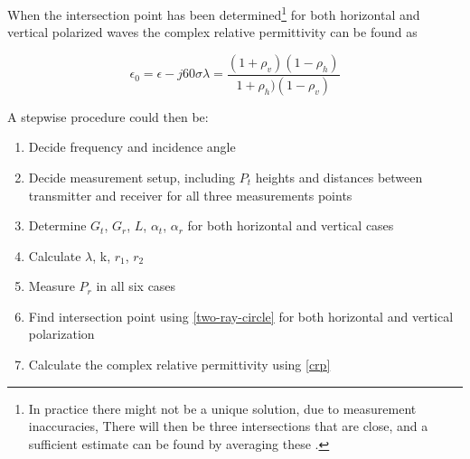 When the intersection point has been determined\footnote{In practice there might not be a unique solution, due to measurement inaccuracies, There will then be three intersections that are close, and a sufficient estimate can be found by averaging these \citep{Kim}.} for both horizontal and vertical polarized waves the complex relative permittivity can be found as\citep{Kim}

\begin{equation}\label{crp}
\epsilon_0=\epsilon-j60\sigma\lambda=\frac{(1+\rho_v)(1-\rho_h)}{1+\rho_h)(1-\rho_v)}
\end{equation}
\begin{where}
\end{where}

A stepwise procedure could then be:
\begin{enumerate}
	\item Decide frequency and incidence angle
	\item Decide measurement setup, including $P_t$ heights and distances between transmitter and receiver for all three measurements points
	\item Determine $G_t$, $G_r$, $L$, $\alpha_t$, $\alpha_r$ for both horizontal and vertical cases
	\item Calculate $\lambda$, k, $r_1$, $r_2$
	\item Measure $P_r$ in all six cases
	\item Find intersection point using \autoref{two-ray-circle} for both horizontal and vertical polarization
	\item Calculate the complex relative permittivity using \autoref{crp}
\end{enumerate}


